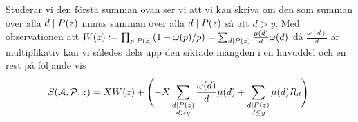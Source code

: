 Studerar vi den första summan ovan ser vi att vi kan skriva om den som summan över alla \(d \mid P(z)\) minus summan över alla \(d \mid P(z)\) så att \(d > y\).
Med observationen att \(W(z) := \prod_{p \mid P(z)} (1 - \omega(p)/p) = \sum_{d \mid P(z)} \frac{\mu(d)}{d} \omega(d)\) då \(\frac{\omega(d)}{d}\) är multiplikativ kan vi således dela upp den siktade mängden i en huvuddel och en rest på följande vis
\begin{align*}
    S(\mathcal{A}, \mathcal{P}, z) = X W(z) + \Biggl(- X \sum_{\substack{d \mid P(z) \\ d > y}} \frac{\omega(d)}{d} \mu(d) + \sum_{\substack{d \mid P(z)  \\ d \leq y}} \mu(d) R_d \Biggr).
\end{align*}

